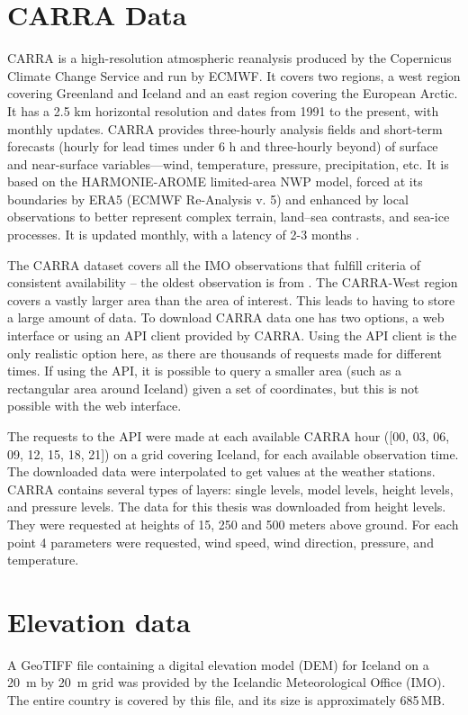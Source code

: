 \section{CARRA Data}
CARRA is a high-resolution atmospheric reanalysis produced by the Copernicus Climate Change Service and run by ECMWF. It covers two regions, a west region covering Greenland and Iceland and an east region covering the European Arctic. It has a 2.5 km horizontal resolution and dates from 1991 to the present, with monthly updates. CARRA provides three-hourly analysis fields and short-term forecasts (hourly for lead times under 6 h and three-hourly beyond) of surface and near-surface variables—wind, temperature, pressure, precipitation, etc. It is based on the HARMONIE-AROME limited-area NWP model, forced at its boundaries by ERA5 (ECMWF Re-Analysis v. 5) and enhanced by local observations to better represent complex terrain, land–sea contrasts, and sea-ice processes. It is updated monthly, with a latency of 2-3 months \cite{carra_information}.

The CARRA dataset covers all the IMO observations that fulfill criteria of consistent availability – the oldest observation is from \startDateVedur. The CARRA-West region covers a vastly larger area than the area of interest. This leads to having to store a large amount of data. To download CARRA data one has two options, a web interface or using an API client provided by CARRA. Using the API client is the only realistic option here, as there are thousands of requests made for different times. If using the API, it is possible to query a smaller area (such as a rectangular area around Iceland) given a set of coordinates, but this is not possible with the web interface.

The requests to the API were made at each available CARRA hour ([00, 03, 06, 09, 12, 15, 18, 21]) on a grid covering Iceland, for each available observation time. The downloaded data were interpolated to get values at the weather stations. CARRA contains several types of layers: single levels, model levels, height levels, and pressure levels. The data for this thesis was downloaded from height levels. They were requested at heights of 15, 250 and 500 meters above ground. For each point 4 parameters were requested, wind speed, wind direction, pressure, and temperature.

\section{Elevation data}
A GeoTIFF file containing a digital elevation model (DEM) for Iceland on a 20~m by 20~m grid was provided by the Icelandic Meteorological Office (IMO). The entire country is covered by this file, and its size is approximately 685\,MB.

